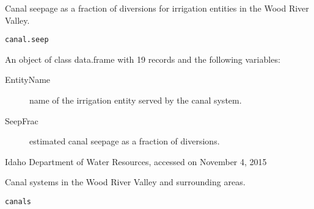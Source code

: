 \documentclass[a4paper]{book}
\begin{document}
%
\begin{Description}\relax
Canal seepage as a fraction of diversions for irrigation entities in the Wood River Valley.
\end{Description}
%
\begin{Usage}
\begin{verbatim}
canal.seep
\end{verbatim}
\end{Usage}
%
\begin{Format}
An object of class data.frame with 19 records and the following variables:
\begin{description}

\item[EntityName] name of the irrigation entity served by the canal system.
\item[SeepFrac] estimated canal seepage as a fraction of diversions.

\end{description}

\end{Format}
%
\begin{Source}\relax
Idaho Department of Water Resources, accessed on November 4, 2015
\end{Source}
%
\begin{SeeAlso}\relax
{}
\end{SeeAlso}
%
\begin{Examples}
\end{Examples}
%
\begin{Description}\relax
Canal systems in the Wood River Valley and surrounding areas.
\end{Description}
%
\begin{Usage}
\begin{verbatim}
canals
\end{verbatim}
\end{Usage}
\end{document}
